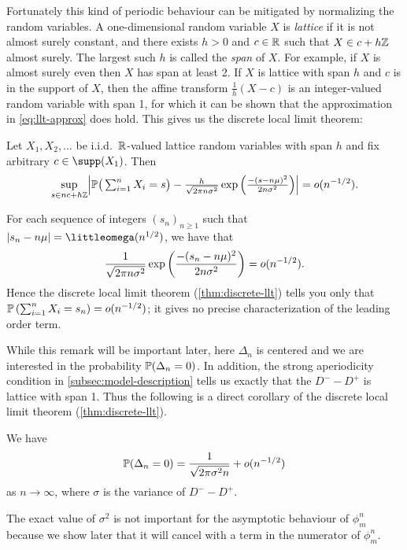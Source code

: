 Fortunately this kind of periodic behaviour can be mitigated by normalizing the random variables. A one-dimensional random variable $X$ is \emph{lattice} if it is not almost surely constant, and there exists $h > 0$ and $c \in \R$ such that $X \in c + h\Z$ almost surely. The largest such $h$ is called the \emph{span} of $X$. For example, if $X$ is almost surely even then $X$ has span at least 2. If $X$ is lattice with span $h$ and $c$ is in the support of $X$, then the affine transform $\frac{1}{h}(X - c)$ is an integer-valued random variable with span 1, for which it can be shown that the approximation in \cref{eq:llt-approx} does hold. This gives us the discrete local limit theorem:
\begin{theorem}
    \label{thm:discrete-llt}
    Let $X_1, X_2, \ldots$ be i.i.d.\ $\R$-valued lattice random variables with span $h$ and fix arbitrary $c \in \supp(X_1)$. Then
    \begin{equation*}
        \sup_{s \in n c + h \Z} \abs*{
            \P\big( \textstyle \sum_{i=1}^n X_i = s \big) 
            -
            \frac{h}{\sqrt{2 \pi n \sigma^2}}  \exp \left(
                \frac{-(s - n \mu)^2}{2 n \sigma^2}
            \right)
        } = \littleo(n^{-1/2}).
    \end{equation*}
\end{theorem}

\begin{remark}
    \label{rem:llt-limitations}
    For each sequence of integers $(s_n)_{n \geq 1}$ such that $\abs{s_n - n \mu} = \littleomega(n^{1/2})$, we have that
    \begin{equation*}
        \frac{1}{\sqrt{2 \pi n \sigma^2}}  \exp \left(
            \frac{-(s_n - n \mu)^2}{2 n \sigma^2}
        \right)
        = \littleo(n^{-1/2}).
    \end{equation*}
    Hence the discrete local limit theorem (\cref{thm:discrete-llt}) tells you only that $\P\left(\sum_{i=1}^n X_i = s_n\right) = \littleo(n^{-1/2})$; it gives no precise characterization of the leading order term.
\end{remark}

While this remark will be important later, here $\Delta_n$ is centered and we are interested in the probability $\P(\Delta_n = 0)$. In addition, the strong aperiodicity condition in \cref{subsec:model-description} tells us exactly that the $D^- - D^+$ is lattice with span 1. Thus the following is a direct corollary of the discrete local limit theorem (\cref{thm:discrete-llt}).
\begin{corollary}
    \label{cor:measure-change-denominator-control}
    We have
    \begin{equation*}
        \P(\Delta_n = 0) = \frac{1}{\sqrt{2 \pi \sigma^2 n}} + \littleo(n^{-1/2})
    \end{equation*}
    as $n \to \infty$, where $\sigma$ is the variance of $D^- - D^+$.
\end{corollary}
\begin{remark}
    The exact value of $\sigma^2$ is not important for the asymptotic behaviour of $\phi^n_m$ because we show later that it will cancel with a term in the numerator of $\phi^n_m$.
\end{remark}

